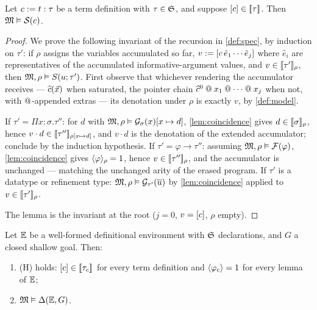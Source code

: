 \begin{lemma}
\label{lem:spec-valid}
Let $c \mathrel{:=} t : \tau$ be a term definition with $\tau \in \mathfrak{S}$, and
suppose $[c] \in [\![ \tau ]\!]_{}$.  Then $\mathfrak{M} \vDash \mathcal{S}(c)$.
\end{lemma}

\begin{proof}
We prove the following invariant of the recursion in \cref{def:spec}, by
induction on $\tau'$: if $\rho$ assigns the variables accumulated so far,
$v \mathrel{:=} [c\,\hat{e}_1 \cdots \hat{e}_j]$ where $\hat{e}_i$ are
representatives of the accumulated informative-argument values, and $v
\in [\![ \tau' ]\!]_{\rho}$, then $\mathfrak{M}, \rho \vDash S(u; \tau')$.  First
observe that whichever rendering the accumulator receives --- $\widehat{c}
(\vec{x})$ when saturated, the pointer chain $\widehat{c}^0 \mathbin{@} x_1 \mathbin{@}
\cdots \mathbin{@} x_j$ when not, with $\mathbin{@}$-appended extras --- its
denotation under $\rho$ is exactly $v$, by \cref{def:model}.

If $\tau' = \Pi x{:}\sigma.\tau''$: for $d$ with $\mathfrak{M}, \rho \vDash
\mathcal{G}_{\sigma}(x)[x \mapsto d]$, \cref{lem:coincidence} gives $d \in
[\![ \sigma ]\!]_{\rho}$, hence $v \cdot d \in [\![ \tau'' ]\!]_{\rho[x \mapsto
d]}$, and $v \cdot d$ is the denotation of the extended accumulator;
conclude by the induction hypothesis.  If $\tau' = \varphi \to \tau''$:
assuming $\mathfrak{M}, \rho \vDash \mathcal{F}(\varphi)$, \cref{lem:coincidence} gives
$\langle \varphi \rangle_{\rho} = 1$, hence $v \in [\![ \tau'' ]\!]_{\rho}$, and the
accumulator is unchanged --- matching the unchanged arity of the erased
program.  If $\tau'$ is a datatype or refinement type: $\mathfrak{M}, \rho \vDash
\mathcal{G}_{\tau'}(\overline{u})$ by \cref{lem:coincidence} applied to $v \in
[\![ \tau' ]\!]_{\rho}$.

The lemma is the invariant at the root ($j = 0$, $v = [c]$, $\rho$
empty).
\end{proof}

\begin{theorem}
\label{thm:env-validity}
Let $\mathbb{E}$ be a well-formed definitional environment with $\mathfrak{S}$
declarations, and $G$ a closed shallow goal.  Then:
\begin{enumerate}[leftmargin=2em]
\item (H) holds: $[c] \in [\![ \tau_c ]\!]_{}$ for every term definition
  and $\langle \varphi_c \rangle = 1$ for every lemma of $\mathbb{E}$;
\item $\mathfrak{M} \vDash \Delta(\mathbb{E},G)$.
\end{enumerate}
\end{theorem}

